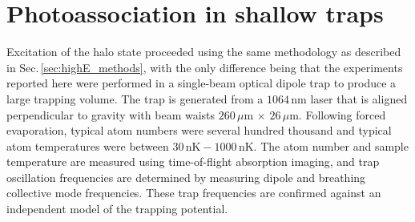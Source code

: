 
\section{Photoassociation in shallow traps} \label{sec:lowE_theory}
Excitation of the halo state proceeded using the same methodology as described in Sec.\,\ref{sec:highE_methods}, with the only difference being that the experiments reported here were performed in a single-beam optical dipole trap to produce a large trapping volume.
The trap is generated from a $1064\,\text{nm}$ laser that is aligned perpendicular to gravity with beam waists $260\,\mu\text{m}\,\times\,26\,\mu\text{m}$.
Following forced evaporation, typical atom numbers were several hundred thousand and typical atom temperatures were between $30\,\text{nK} - 1000\,\text{nK}$.
The atom number and sample temperature are measured using time-of-flight absorption imaging, and trap oscillation frequencies are determined by measuring dipole and breathing collective mode frequencies.
These trap frequencies are confirmed against an independent model of the trapping potential.

